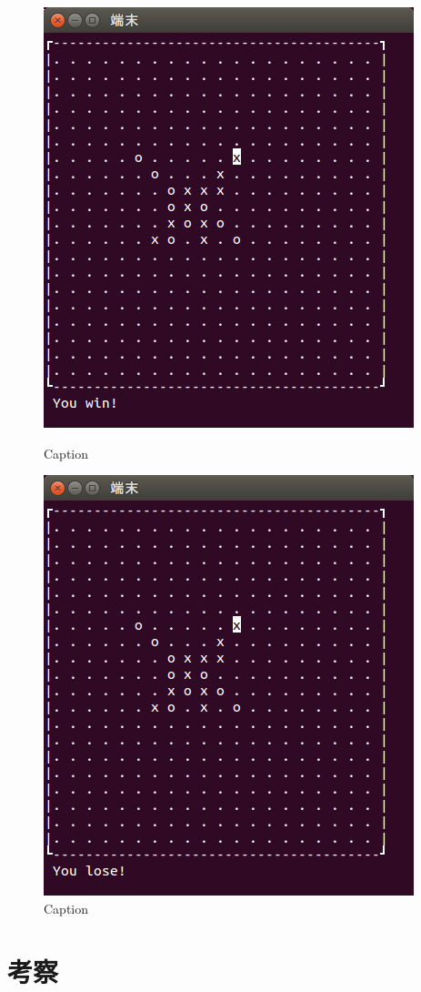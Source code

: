 \documentclass[a4j, titlepage, 10pt]{jsarticle}
\begin{document}
\begin{figure}[H]
  \begin{minipage}{0.5\hsize}
    \centering
    \includegraphics[scale=0.5]{img/fin-1.png}
    \caption{Caption}
    \label{fig:fin-1.png}
  \end{minipage}
  \begin{minipage}{0.5\hsize}
    \includegraphics[scale=0.5]{img/fin-2.png}
    \caption{Caption}
    \label{fig:fin-2.png}
  \end{minipage}
\end{figure}


\section{考察}
\end{document}
